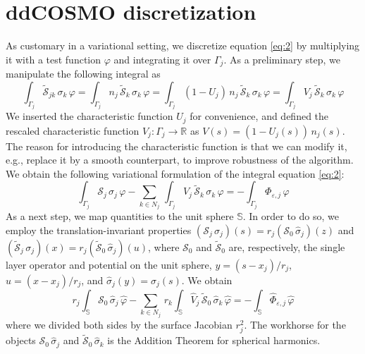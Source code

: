 \documentclass[aip,jcp,a4paper,11pt]{revtex4-1}
\newcommand{\cS}{\mathcal{S}}
\begin{document}
\section{ddCOSMO discretization \label{app:cosmo}}
As customary in a variational setting, we discretize equation \eqref{eq:2} by multiplying it with a test function $\varphi$ and integrating it over $\Gamma_j$. As a preliminary step, we manipulate the following integral as
\[
\int_{\Gamma_j} \tilde{\cS}_{jk} \, \sigma_k \, \varphi =\int_{\Gamma_j} n_j \, \tilde{\cS}_{k} \, \sigma_k \, \varphi = \int_{\Gamma_j} (1 - U_j ) \,n_j \, \tilde{\cS}_{k} \, \sigma_k \, \varphi = \int_{\Gamma_j} V_j \, \tilde{\cS}_{k} \, \sigma_k \, \varphi
\]
We inserted the characteristic function $U_j$ for convenience, and defined the rescaled characteristic function $V_j : \Gamma_j \to \mathbb{R}$ as $V(s) = (1 - U_j(s)) \, n_j(s)$. The reason for introducing the characteristic function is that we can modify it, e.g., replace it by a smooth counterpart, to improve robustness of the algorithm. We obtain the following variational formulation of the integral equation \eqref{eq:2}:
\[
\int_{\Gamma_j} \cS_j \, \sigma_j \, \varphi - \sum_{k \in N_j} \, \int_{\Gamma_j} V_j \, \tilde{\cS}_{k} \, \sigma_k \, \varphi= -\int_{\Gamma_j}  \Phi_{\varepsilon,j} \, \varphi %
\]
As a next step, we map quantities to the unit sphere $\mathbb{S}$. In order to do so, we employ the translation-invariant properties $(\cS_j \, \sigma_j)(s) = r_j( \cS_0 \, \hat{\sigma}_j)(z)$ and $(\tilde{\cS}_j \, \sigma_j)(x) = r_j( \tilde{\cS}_0 \, \hat{\sigma}_j)(u)$, where $\cS_0$ and $\tilde{\cS}_0$ are, respectively, the single layer operator and potential on the unit sphere, $y = (s - x_j)/r_j$, $u = (x - x_j)/r_j$, and $\hat{\sigma}_j(y) = \sigma_j(s)$. We obtain
\begin{equation}\label{eq:50}
r_j \int_{\mathbb{S}} \cS_0 \, \hat{\sigma}_j \, \hat{\varphi} - \sum_{k \in N_j} \, r_k  \int_{\mathbb{S}} \hat{V}_j \, \tilde{\cS}_0 \, \hat{\sigma}_k \, \hat{\varphi}= -\int_{\mathbb{S}}  \hat{\Phi}_{\varepsilon,j} \, \hat{\varphi}
\end{equation}
where we divided both sides by the surface Jacobian $r_j^2$. The workhorse for the objects $\cS_0 \, \hat{\sigma}_j$ and $\tilde{\cS}_0 \, \hat{\sigma}_k$ is the Addition Theorem for spherical harmonics.
\end{document}
